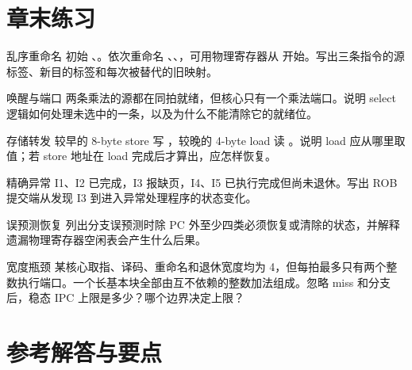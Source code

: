 \section*{章末练习}

\begin{chapterexercise}{乱序重命名}
初始 、。依次重命名 、、，可用物理寄存器从  开始。写出三条指令的源标签、新目的标签和每次被替代的旧映射。
\end{chapterexercise}

\begin{chapterexercise}{唤醒与端口}
两条乘法的源都在同拍就绪，但核心只有一个乘法端口。说明 select 逻辑如何处理未选中的一条，以及为什么不能清除它的就绪位。
\end{chapterexercise}

\begin{chapterexercise}{存储转发}
较早的 8-byte store 写 ，较晚的 4-byte load 读 。说明 load 应从哪里取值；若 store 地址在 load 完成后才算出，应怎样恢复。
\end{chapterexercise}

\begin{chapterexercise}{精确异常}
I1、I2 已完成，I3 报缺页，I4、I5 已执行完成但尚未退休。写出 ROB 提交端从发现 I3 到进入异常处理程序的状态变化。
\end{chapterexercise}

\begin{chapterexercise}{误预测恢复}
列出分支误预测时除 PC 外至少四类必须恢复或清除的状态，并解释遗漏物理寄存器空闲表会产生什么后果。
\end{chapterexercise}

\begin{chapterexercise}{宽度瓶颈}
某核心取指、译码、重命名和退休宽度均为 4，但每拍最多只有两个整数执行端口。一个长基本块全部由互不依赖的整数加法组成。忽略 miss 和分支后，稳态 IPC 上限是多少？哪个边界决定上限？
\end{chapterexercise}

\section*{参考解答与要点}

